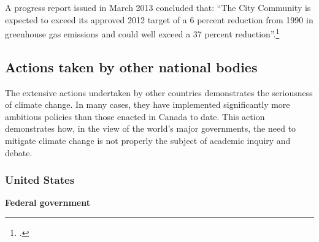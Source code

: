 \documentclass[10pt]{article}
\begin{document}
A progress report issued in March 2013 concluded that: ``The City Community is expected to exceed its approved 2012 target of a 6 percent reduction from 1990 in greenhouse gas emissions and could well exceed a 37 percent reduction''.\footcite[][p. 15]{Toronto2013GHGmemo}






		\subsection{Actions taken by other national bodies}
		
		
		
The extensive actions undertaken by other countries demonstrates the seriousness of climate change.
In many cases, they have implemented significantly more ambitious policies than those enacted in Canada to date.
This action demonstrates how, in the view of the world's major governments, the need to mitigate climate change is not properly the subject of academic inquiry and debate.


		
		\subsubsection{United States}
		
		
		
\textbf{Federal government}
\end{document}
